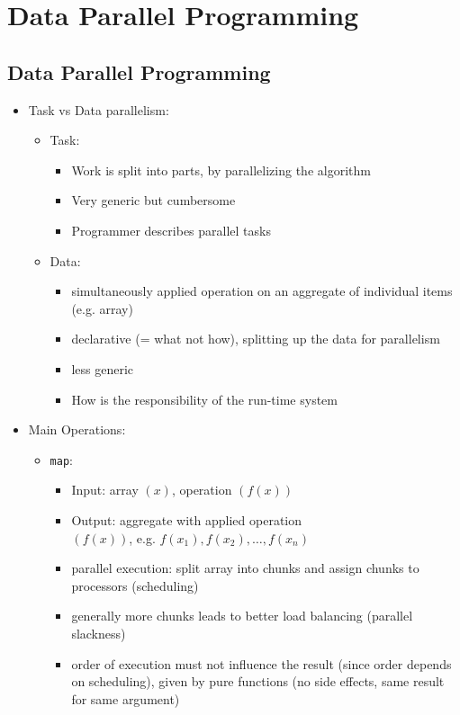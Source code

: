 \documentclass[a4paper]{article}
\newcommand{\inline}[1]{\lstinline!#1!}%
\begin{document}
\section{Data Parallel Programming}
\subsection{Data Parallel Programming}
\begin{itemize}
\item Task vs Data parallelism: 
\begin{itemize}
\item Task: 
\begin{itemize}
\item Work is split into parts, by parallelizing the algorithm
\item Very generic but cumbersome
\item Programmer describes parallel tasks
\end{itemize}
\item Data: 
\begin{itemize}
\item simultaneously applied operation on an aggregate of individual items (e.g. array)
\item declarative (= what not how), splitting up the data for parallelism
\item less generic
\item How is the responsibility of the run-time system
\end{itemize}
\end{itemize}
\item Main Operations:
\begin{itemize}
\item \inline{map}: 
\begin{itemize}
\item Input: array $(x)$, operation $(f(x))$
\item Output: aggregate with applied operation\\ $(f(x))$, e.g. $f(x_1),f(x_2),\dots,f(x_n)$
\item parallel execution: split array into chunks and assign chunks to processors (scheduling)
\item generally more chunks leads to better load balancing (parallel slackness)
\item order of execution must not influence the result (since order depends on scheduling), given by pure functions (no side effects, same result for same argument)
\end{itemize}

\end{itemize}
\end{itemize}
\end{document}
